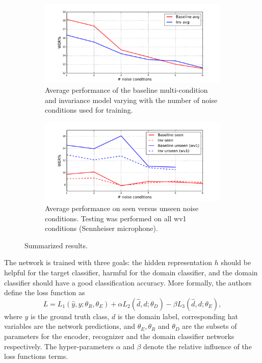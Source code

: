 \documentclass[a4paper]{article}
\begin{document}
\begin{figure}[t]
    \begin{subfigure}[b]{\linewidth}
        \centering
        \includegraphics[width=1.1\linewidth]{wer_avg.pdf}
        \caption{Average performance of the baseline multi-condition and invariance model varying with  the number of noise
            conditions used for training.}
        \label{fig:results}
    \end{subfigure}
    \begin{subfigure}[b]{\linewidth}
        \centering
        \includegraphics[width=1.1\linewidth]{wer_seen_unseen.pdf}
        \caption{Average performance on seen versus unseen noise conditions.
            Testing was performed on all wv1 conditions (Sennheiser microphone).
            }
    \end{subfigure}
    \caption{Summarized results.}
    \label{fig:results}
\end{figure}

    The network is trained with three goals: the hidden representation $h$ should
    be helpful for the target classifier, harmful for the domain classifier,
   and the domain classifier should have a good classification accuracy. More 
    formally, the authors define the loss function as
    \begin{equation}
        L = L_1(\hat{y}, y; \theta_R, \theta_E) + 
        \alpha L_2(\hat{d}, d; \theta_D) -
        \beta L_3(\hat{d}, d; \theta_E),
        \label{eq:grm}
    \end{equation}
    where $y$ is the ground truth class, $d$ is the domain label, corresponding
    hat variables are the network predictions, and $\theta_E, \theta_R$ and 
    $\theta_D$ are the subsets of  parameters for the encoder,
    recognizer and the domain classifier networks respectively. The hyper-parameters
    $\alpha$ and $\beta$ denote the relative influence of the loss functions terms.
\end{document}
